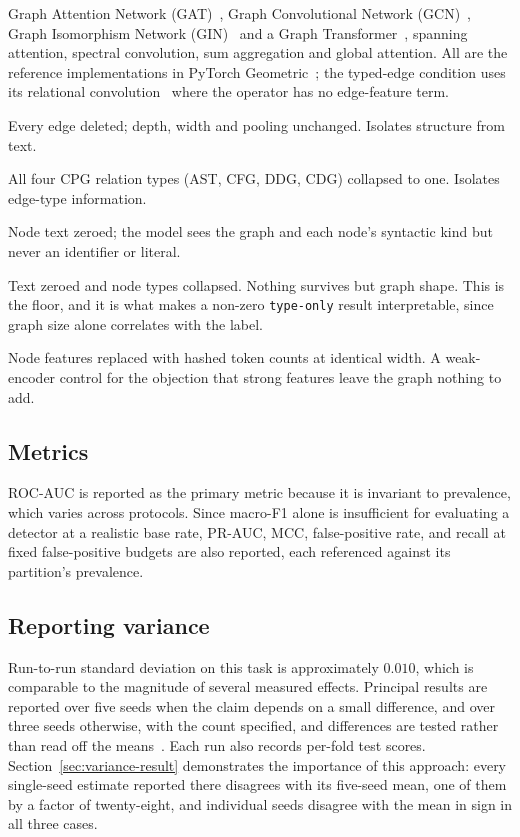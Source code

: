 \begin{description}[leftmargin=1.2em,itemsep=2pt]
  \item[Architectures] Graph Attention Network (GAT)~\citep{DBLP:conf/iclr/VelickovicCCRLB18}, Graph Convolutional Network (GCN)~\citep{Kipf2016SemiSupervisedCW}, Graph Isomorphism Network (GIN)~\citep{xu2018how} and a Graph Transformer~\citep{3454287.3455360,shi2021masked}, spanning attention, spectral convolution, sum aggregation and global attention. All are the reference implementations in PyTorch Geometric~\citep{fey2019fast}; the typed-edge condition uses its relational convolution~\citep{schlichtkrull2018modeling} where the operator has no edge-feature term.
  \item[\texttt{no graph}] Every edge deleted; depth, width and pooling unchanged. Isolates structure from text.
  \item[\texttt{untyped}] All four CPG relation types (AST, CFG, DDG, CDG) collapsed to one. Isolates edge-type information.
  \item[\texttt{type-only}] Node text zeroed; the model sees the graph and each node's syntactic kind but never an identifier or literal.
  \item[\texttt{topology}] Text zeroed and node types collapsed. Nothing survives but graph shape. This is the floor, and it is what makes a non-zero \texttt{type-only} result interpretable, since graph size alone correlates with the label.
  \item[bag-of-words] Node features replaced with hashed token counts at identical width. A weak-encoder control for the objection that strong features leave the graph nothing to add.
\end{description}


\subsection{Metrics}
ROC-AUC is reported as the primary metric because it is invariant to prevalence, which varies across protocols. Since macro-F1 alone is insufficient for evaluating a detector at a realistic base rate, PR-AUC, MCC, false-positive rate, and recall at fixed false-positive budgets are also reported, each referenced against its partition's prevalence.

\subsection{Reporting variance}
\label{sec:variance}
Run-to-run standard deviation on this task is approximately $0.010$, which is comparable to the magnitude of several measured effects. Principal results are reported over five seeds when the claim depends on a small difference, and over three seeds otherwise, with the count specified, and differences are tested rather than read off the means~\citep{arcuri2011practical}. Each run also records per-fold test scores. Section~\ref{sec:variance-result} demonstrates the importance of this approach: every single-seed estimate reported there disagrees with its five-seed mean, one of them by a factor of twenty-eight, and individual seeds disagree with the mean in sign in all three cases.

